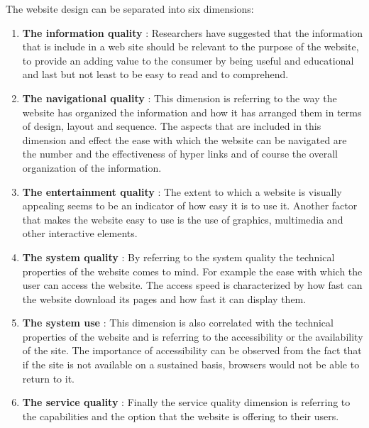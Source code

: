 \documentclass{article}
\begin{document}
The website design can be separated into six dimensions\cite{key9}:
\begin{enumerate}
\item \textbf{The information quality} : Researchers have suggested that the information that is include in a web site should be relevant to the purpose of the website\cite{key14, key16}, to provide an adding value to the consumer by being useful and educational\cite{key18} and last but not least to be easy to read and to comprehend.\cite{key19}
\item \textbf{The navigational quality} : This dimension is referring to the way the website has organized the information and how it has arranged them in terms of design, layout and sequence. The aspects that are included in this dimension and effect the ease with which the website can be navigated are the number and the effectiveness of hyper links and of course the overall organization of the information.\cite{key11,key20,key23,key24,key25}
\item \textbf{The entertainment quality} : The extent to which a website is visually appealing\cite{key19,key25} seems to be an indicator of how easy it is to use it. Another factor that makes the website easy to use is the use of graphics, multimedia and other interactive elements.\cite{key12}
\item \textbf{The system quality} : By referring to the system quality the technical properties of the website comes to mind. For example the ease with which the user can access the website. The access speed is characterized by how fast can the website download its pages and how fast it can display them.\cite{key19,key3,key22}
\item \textbf{The system use} : This dimension is also correlated with the technical properties of the website and is referring to the accessibility or the availability of the site.\cite{key24} The importance of accessibility can be observed from the fact that if the site is not available on a sustained basis, browsers would not be able to return to it.
\item \textbf{The service quality} : Finally the service quality dimension is referring to the capabilities and the option that the website is offering to their users.
\end{enumerate} 
\end{document}

